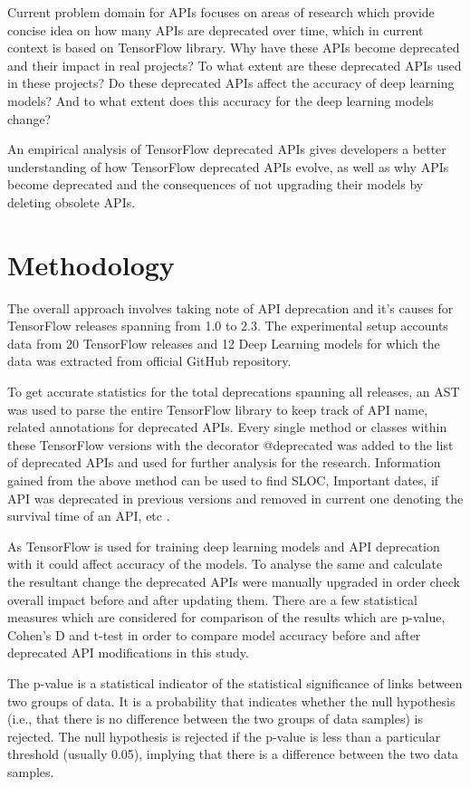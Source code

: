 \documentclass[12pt,letterpaper]{report}
\begin{document}
Current problem domain for APIs focuses on areas of research which provide concise idea on how many APIs are deprecated over time, which in current context is based on TensorFlow library. Why have these APIs become deprecated and their impact in real projects? To what extent are these deprecated APIs used in these projects? Do these deprecated APIs affect the accuracy of deep learning models? And to what extent does this accuracy for the deep learning models change? 

An empirical analysis of TensorFlow deprecated APIs gives developers a better understanding of how TensorFlow deprecated APIs evolve, as well as why APIs become deprecated and the consequences of not upgrading their models by deleting obsolete APIs.

\section{Methodology} \label{sec:methodology}
The overall approach involves taking note of API deprecation and it's causes for TensorFlow releases spanning from 1.0 to 2.3. The experimental setup accounts data from 20 TensorFlow releases and 12 Deep Learning models for which the data was extracted from official GitHub repository.

To get accurate statistics for the total deprecations spanning all releases, an AST was used to parse the entire TensorFlow library to keep track of API name, related annotations for deprecated APIs. Every single method or classes within these TensorFlow versions with the decorator @deprecated was added to the list of deprecated APIs and used for further analysis for the research. Information gained from the above method can be used to find SLOC, Important dates, if API was deprecated in previous versions and removed in current one denoting the survival time of an API, etc \cite{charsDeep}.

As TensorFlow is used for training deep learning models and API deprecation with it could affect accuracy of the models. To analyse the same and calculate the resultant change the deprecated APIs were manually upgraded in order check overall impact before and after updating them. There are a few statistical measures which are considered for comparison of the results which are p-value, Cohen's D and t-test in order to compare model accuracy before and after deprecated API modifications in this study.

The p-value is a statistical indicator of the statistical significance of links between two groups of data. It is a probability that indicates whether the null hypothesis (i.e., that there is no difference between the two groups of data samples) is rejected. The null hypothesis is rejected if the p-value is less than a particular threshold (usually 0.05), implying that there is a difference between the two data samples. 
\end{document}
